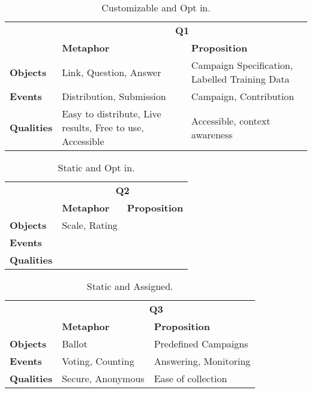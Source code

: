 
\begin{table}[!htbp]
\centering
\begin{tabularx}{\textwidth}{X|X|X|}
\cline{2-3}
                                         & \multicolumn{2}{c|}{\textbf{Q1}}            \\ \cline{2-3}  
                                         & \textbf{Metaphor}                                     & \textbf{Proposition}    \\ \hline
\multicolumn{1}{|l|}{\textbf{Objects}}   & Link, Question, Answer                                & Campaign Specification, Labelled Training Data \\ \hline
\multicolumn{1}{|l|}{\textbf{Events}}    & Distribution, Submission                              & Campaign, Contribution         \\ \hline
\multicolumn{1}{|l|}{\textbf{Qualities}} & Easy to distribute, Live results, Free to use, Accessible & Accessible, context awareness  \\ \hline
\end{tabularx}
\caption{Customizable and Opt in.}
\end{table}
\FloatBarrier

\begin{table}[!htbp]
\centering
\begin{tabular}{l|l|l|}
\cline{2-3}
                                         & \multicolumn{2}{c|}{\textbf{Q2}}         \\ \cline{2-3} 
                                         & \textbf{Metaphor} & \textbf{Proposition} \\ \hline
\multicolumn{1}{|l|}{\textbf{Objects}}   & Scale, Rating     &                      \\ \hline
\multicolumn{1}{|l|}{\textbf{Events}}    &                   &                      \\ \hline
\multicolumn{1}{|l|}{\textbf{Qualities}} &                   &                      \\ \hline
\end{tabular}
\caption{Static and Opt in.}
\end{table}
\FloatBarrier

\begin{table}[!htbp]
\centering
\begin{tabular}{l|l|l|}
\cline{2-3}
                                         & \multicolumn{2}{c|}{\textbf{Q3}}         \\ \cline{2-3} 
                                         & \textbf{Metaphor} & \textbf{Proposition}  \\ \hline
\multicolumn{1}{|l|}{\textbf{Objects}}   & Ballot            & Predefined Campaigns  \\ \hline
\multicolumn{1}{|l|}{\textbf{Events}}    & Voting, Counting  & Answering, Monitoring \\ \hline
\multicolumn{1}{|l|}{\textbf{Qualities}} & Secure, Anonymous & Ease of collection    \\ \hline
\end{tabular}
\caption{Static and Assigned.}
\end{table}
\FloatBarrier

